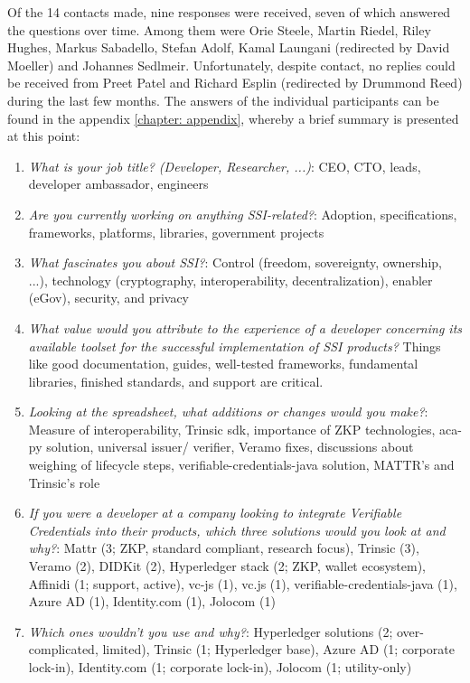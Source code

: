 	Of the 14 contacts made, nine responses were received, seven of which answered the questions over time. Among them were Orie Steele, Martin Riedel, Riley Hughes, Markus Sabadello, Stefan Adolf, Kamal Laungani (redirected by David Moeller) and Johannes Sedlmeir. Unfortunately, despite contact, no replies could be received from Preet Patel and Richard Esplin (redirected by Drummond Reed) during the last few months. The answers of the individual participants can be found in the appendix \ref{chapter: appendix}, whereby a brief summary is presented at this point:
	
    \begin{enumerate}
        \item \textit{What is your job title? (Developer, Researcher, ...)}: CEO, CTO, leads, developer ambassador, engineers
        \item \textit{Are you currently working on anything \ac{SSI}-related?}: Adoption, specifications, frameworks, platforms, libraries, government projects   
        \item \textit{What fascinates you about \ac{SSI}?}: Control (freedom, sovereignty, ownership, ...), technology (cryptography, interoperability, decentralization), enabler (eGov), security, and privacy
        \item \textit{What value would you attribute to the experience of a developer concerning its available toolset for the successful implementation of \ac{SSI} products?} Things like good documentation, guides, well-tested frameworks, fundamental libraries, finished standards, and support are critical.	
        \item \textit{Looking at the spreadsheet, what additions or changes would you make?}: Measure of interoperability, Trinsic \ac{sdk}, importance of \ac{ZKP} technologies, aca-py solution, universal issuer/ verifier, Veramo fixes, discussions about weighing of lifecycle steps, verifiable-credentials-java solution, MATTR's and Trinsic's role
        \item \textit{If you were a developer at a company looking to integrate Verifiable Credentials into their products, which three solutions would you look at and why?}:	Mattr (3; ZKP, standard compliant, research focus), Trinsic (3), Veramo (2), DIDKit (2), Hyperledger stack (2; ZKP, wallet ecosystem), Affinidi (1; support, active), vc-js (1), vc.js (1), verifiable-credentials-java (1), Azure AD (1), Identity.com (1), Jolocom (1)	
        \item \textit{Which ones wouldn't you use and why?}: Hyperledger solutions (2; over-complicated, limited), Trinsic (1; Hyperledger base), Azure AD (1; corporate lock-in), Identity.com (1; corporate lock-in), Jolocom (1; utility-only)

\end{enumerate}
